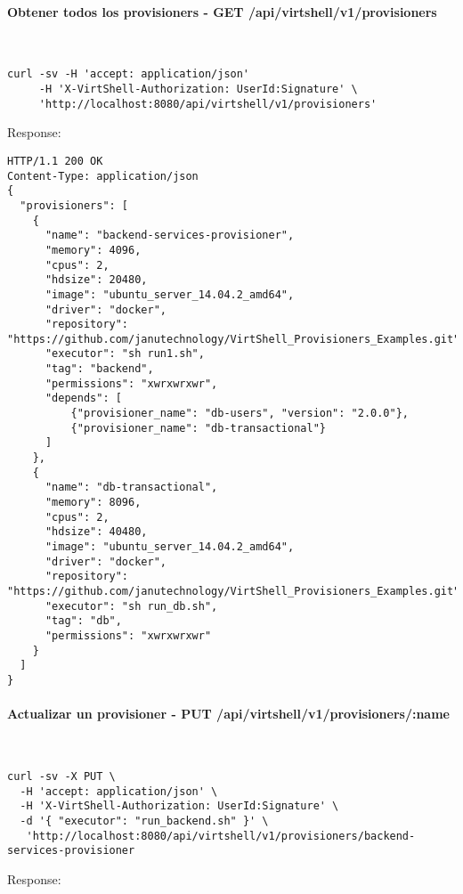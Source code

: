 \paragraph{Obtener todos los provisioners - GET /api/virtshell/v1/provisioners} ~\\

\begin{lstlisting}[style=json]
curl -sv -H 'accept: application/json' 
     -H 'X-VirtShell-Authorization: UserId:Signature' \ 
     'http://localhost:8080/api/virtshell/v1/provisioners'
\end{lstlisting}

Response:

\begin{lstlisting}[style=json]
HTTP/1.1 200 OK
Content-Type: application/json
{
  "provisioners": [
    {
      "name": "backend-services-provisioner",
      "memory": 4096,
      "cpus": 2,
      "hdsize": 20480,
      "image": "ubuntu_server_14.04.2_amd64",
      "driver": "docker",
      "repository": "https://github.com/janutechnology/VirtShell_Provisioners_Examples.git",
      "executor": "sh run1.sh",
      "tag": "backend",
      "permissions": "xwrxwrxwr",
      "depends": [
          {"provisioner_name": "db-users", "version": "2.0.0"},
          {"provisioner_name": "db-transactional"}
      ]
    },
    {
      "name": "db-transactional",
      "memory": 8096,
      "cpus": 2,
      "hdsize": 40480,
      "image": "ubuntu_server_14.04.2_amd64",
      "driver": "docker",
      "repository": "https://github.com/janutechnology/VirtShell_Provisioners_Examples.git",
      "executor": "sh run_db.sh",
      "tag": "db",
      "permissions": "xwrxwrxwr"
    }
  ]
}
\end{lstlisting}

\paragraph{Actualizar un provisioner - PUT /api/virtshell/v1/provisioners/:name} ~\\

\begin{lstlisting}[style=json]
curl -sv -X PUT \
  -H 'accept: application/json' \
  -H 'X-VirtShell-Authorization: UserId:Signature' \
  -d '{ "executor": "run_backend.sh" }' \
   'http://localhost:8080/api/virtshell/v1/provisioners/backend-services-provisioner
\end{lstlisting}

Response:

